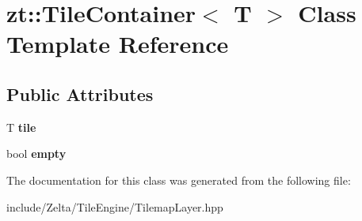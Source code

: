 \hypertarget{classzt_1_1_tile_container}{}\section{zt\+:\+:Tile\+Container$<$ T $>$ Class Template Reference}
\label{classzt_1_1_tile_container}
\subsection*{Public Attributes}
\begin{DoxyCompactItemize}
\item 
\mbox{\label{classzt_1_1_tile_container_aab3b478c2ba149552d49fb7dc75f10af}} 
T {\bfseries tile}
\item 
\mbox{\label{classzt_1_1_tile_container_a0c08596908cd40992020b9d61411cfb9}} 
bool {\bfseries empty}
\end{DoxyCompactItemize}


The documentation for this class was generated from the following file\+:\begin{DoxyCompactItemize}
\item 
include/\+Zelta/\+Tile\+Engine/Tilemap\+Layer.\+hpp\end{DoxyCompactItemize}
